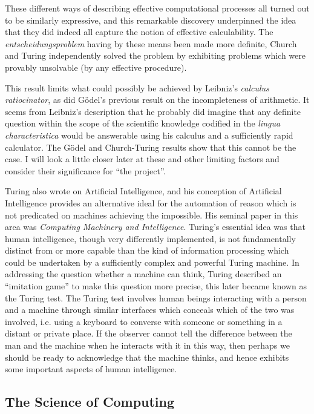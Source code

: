 These different ways of describing effective computational processes
all turned out to be similarly expressive, and this remarkable
discovery underpinned the idea that they did indeed all capture the
notion of effective calculability.
The \emph{entscheidungsproblem} having by these means been made more
definite, Church and Turing independently solved the problem by
exhibiting problems which were provably unsolvable (by any effective procedure).

This result limits what could possibly be achieved by Leibniz's
\emph{calculus ratiocinator}, as did G\"odel's previous result on the
incompleteness of arithmetic.
It seems from Leibniz's description that he probably did imagine that
any definite question within the scope of the scientific knowledge
codified in the \emph{lingua characteristica} would be answerable
using his calculus and a sufficiently rapid calculator.
The G\"odel and Church-Turing results show that this cannot be the case.
I will look a little closer later at these and other limiting factors
and consider their significance for ``the project''.

Turing also wrote on Artificial Intelligence, and his conception of
Artificial Intelligence provides an alternative ideal for the
automation of reason which is not predicated on machines achieving the
impossible.
His seminal paper in this area was \emph{Computing Machinery and Intelligence}\cite{turingCMI}.
Turing's essential idea was that human intelligence, though very
differently implemented, is not fundamentally distinct from or more
capable than the kind of information processing which could be
undertaken by a sufficiently complex and powerful Turing machine.
In addressing the question whether a machine can think, Turing
described an ``imitation game'' to make this question more precise,
this later became known as the Turing test.
The Turing test involves human beings interacting with a person and a
machine through similar interfaces which conceals which of the two was
involved, i.e. using a keyboard to converse with someone or something
in a distant or private place.
If the observer cannot tell the difference between the man and the
machine when he interacts with it in this way, then perhaps we should
be ready to acknowledge that the machine thinks, and hence exhibits
some important aspects of human intelligence.

\subsection{The Science of Computing}

